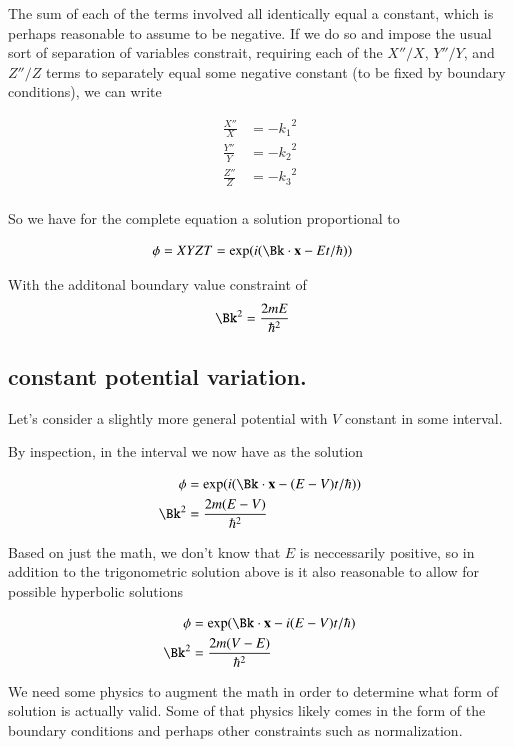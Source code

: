 \documentclass{article}
\begin{document}
The sum of each of the terms involved all identically equal a constant, which is perhaps
reasonable to assume to be negative.  If we do so and impose the usual sort of separation of
variables constrait, requiring each of the $X''/X$, $Y''/Y$, and $Z''/Z$ terms to separately
equal some negative constant (to be fixed by boundary conditions), we can write

\begin{align*}
\frac{X''}{X} &= -{k_1}^2 \\
\frac{Y''}{Y} &= -{k_2}^2 \\
\frac{Z''}{Z} &= -{k_3}^2 \\
\end{align*}

So we have for the complete equation a solution proportional to

\begin{align*}
\phi = X Y Z T &= \exp(i(\Bk \cdot \Bx - E t/\hbar))
\end{align*}

With the additonal boundary value constraint of
\begin{align*}
\Bk^2 &= \frac{2 m E}{\hbar^2}
\end{align*}

\subsection{ constant potential variation. }

Let's consider a slightly more general potential with $V$ constant in some interval.

By inspection, in the interval we now have as the solution

\begin{align*}
\phi &= \exp(i(\Bk \cdot \Bx - (E - V) t/\hbar)) \\
\Bk^2 &= \frac{2 m (E - V)}{\hbar^2}
\end{align*}

Based on just the math, we don't know that $E$ is neccessarily positive, so in addition to the trigonometric solution above is it also reasonable to
allow for possible
hyperbolic solutions

\begin{align*}
\phi &= \exp(\Bk \cdot \Bx - i(E - V) t/\hbar) \\
\Bk^2 &= \frac{2 m (V - E)}{\hbar^2}
\end{align*}

We need some physics
to augment the math in order to determine what form of solution is actually valid.  Some of that physics likely comes in the form of the boundary conditions and perhaps other constraints such as normalization.
\end{document}
